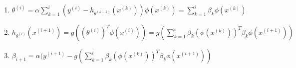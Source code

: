 \begin{answer}
\begin{enumerate}

\item $
\theta^{(i)} = \alpha \sum_{k=1}^{i} (y^{(i)} - h_{\theta^{(k-1)}}(x^{(k)})) \phi(x^{(k)}) =  \sum_{k=1}^{i} \beta_k \phi(x^{(k)})
$
\item $
 h_{\theta^{(i)}}(x^{(i+1)}) = g((\theta^{(i)})^{T} \phi(x^{(i)})) =g( \sum_{k=1}^{i} \beta_k (\phi(x^{(k)})) ^T \beta_k \phi(x^{(i+1)}))
$
\item $
\beta_{i+1} = \alpha(y^{(i+1)} -g( \sum_{k=1}^{i} \beta_k (\phi(x^{(k)})) ^T \beta_k \phi(x^{(i+1)}))
$

\end{enumerate}
\end{answer}
